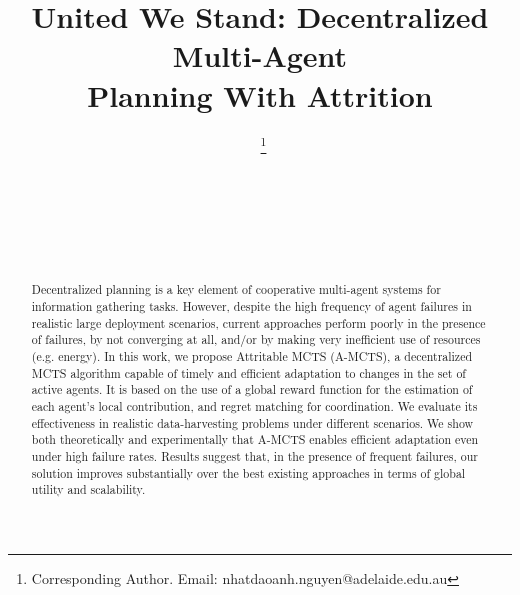 \documentclass{ecai}
\begin{document}

\begin{frontmatter}




\title{United We Stand: Decentralized Multi-Agent \\Planning With Attrition}


\author[A]{~\thanks{Corresponding Author. Email: nhatdaoanh.nguyen@adelaide.edu.au}}
\author[A]{~}
\author[B]{~}
\author[A]{~} 

\address[A]{The University of Adelaide, Australia}
\address[B]{HES SO Valais, Switzerland, and the University of Foggia, Italy.}


\begin{abstract}
Decentralized planning is a key element of cooperative multi-agent systems for information gathering tasks. However, despite the high frequency of agent failures in realistic large deployment scenarios, current approaches perform poorly in the presence of failures, by not converging at all, and/or by making very inefficient use of resources (e.g. energy). In this work, we propose Attritable MCTS (A-MCTS), a decentralized MCTS algorithm capable of timely and efficient adaptation to changes in the set of active agents. It is based on the use of a global reward function for the estimation of each agent's local contribution, and regret matching for coordination. We evaluate its effectiveness in realistic data-harvesting problems under different scenarios. We show both theoretically and experimentally that A-MCTS enables efficient adaptation even under high failure rates. Results suggest that, in the presence of frequent failures, our solution improves substantially over the best existing approaches in terms of global utility and scalability.
\end{abstract}

\end{frontmatter}
\end{document}
